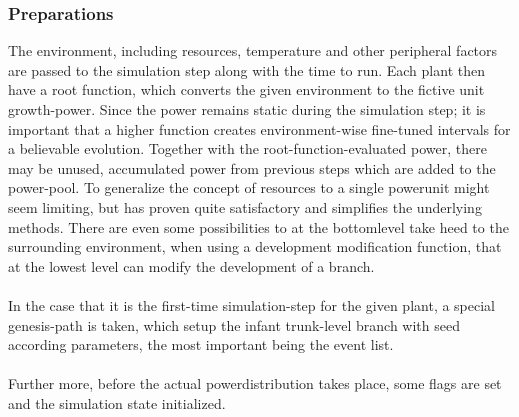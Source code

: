 \subsubsection{Preparations}
The environment, including resources, temperature and other peripheral factors
are passed to the simulation step along with the time to run. Each plant then
have a root function, which converts the given environment to the fictive unit
growth-power. Since the power remains static during the simulation step; it is
important that a higher function creates environment-wise fine-tuned intervals
for a believable evolution. Together with the root-function-evaluated power,
there may be unused, accumulated power from previous steps which are added to
the power-pool. To generalize the concept of resources to a single powerunit
might seem limiting, but has proven quite satisfactory and simplifies the
underlying methods. There are even some possibilities to at the bottomlevel
take heed to the surrounding environment, when using a development modification
function, that at the lowest level can modify the development of a branch.\\\\
In the case that it is the first-time simulation-step for the given plant, a
special genesis-path is taken, which setup the infant trunk-level branch with
seed according parameters, the most important being the event list.
\\\\
Further more, before the actual powerdistribution takes place, some flags are
set and the simulation state initialized.

